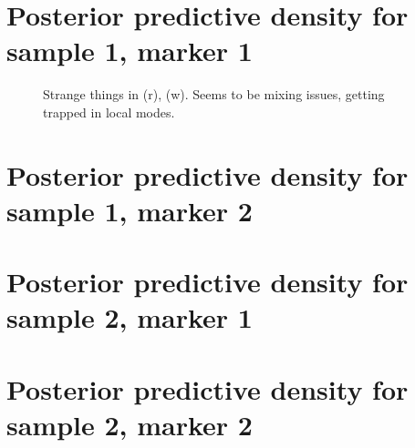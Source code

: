 \documentclass[10pt]{article} %
\begin{document}
\newpage
\section{Posterior predictive density for sample 1, marker 1}
\begin{figure}[H]
  \begin{center}  %
  \end{center}
  \label{fig:dd11}
  \caption{Strange things in (r), (w). Seems to be mixing issues, getting trapped in local modes.}
\end{figure}

\newpage
\section{Posterior predictive density for sample 1, marker 2}
\begin{figure}[H]
  \begin{center}  %
  \end{center}
  \label{fig:dd12}
\end{figure}

\newpage
\section{Posterior predictive density for sample 2, marker 1}
\begin{figure}[H]
  \begin{center}  %
  \end{center}
  \label{fig:dd21}
\end{figure}

\newpage
\section{Posterior predictive density for sample 2, marker 2}
\begin{figure}[H]
  \begin{center}  %
  \end{center}
  \label{fig:dd22}
\end{figure}

\newpage
\end{document}
